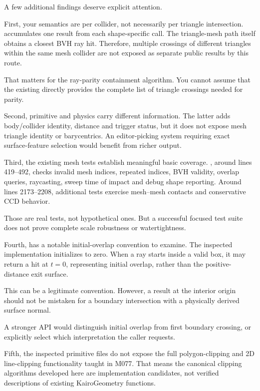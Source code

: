 A few additional findings deserve explicit attention.

First, your  semantics are per collider, not necessarily per triangle intersection.  accumulates one result from each shape-specific  call. The triangle-mesh path itself obtains a closest BVH ray hit. Therefore, multiple crossings of different triangles within the same mesh collider are not exposed as separate public results by this route.

That matters for the ray-parity containment algorithm. You cannot assume that the existing  directly provides the complete list of triangle crossings needed for parity.

Second, primitive  and physics  carry different information. The latter adds body/collider identity, distance and trigger status, but it does not expose mesh triangle identity or barycentrics. An editor-picking system requiring exact surface-feature selection would benefit from richer output.

Third, the existing mesh tests establish meaningful basic coverage. , around lines 419--492, checks invalid mesh indices, repeated indices, BVH validity, overlap queries, raycasting, sweep time of impact and debug shape reporting. Around lines 2173--2208, additional tests exercise mesh--mesh contacts and conservative CCD behavior.

Those are real tests, not hypothetical ones. But a successful focused test suite does not prove complete scale robustness or watertightness.

Fourth,  has a notable initial-overlap convention to examine. The inspected implementation initializes  to zero. When a ray starts inside a valid box, it may return a hit at \(t=0\), representing initial overlap, rather than the positive-distance exit surface.

This can be a legitimate convention. However, a result at the interior origin should not be mistaken for a boundary intersection with a physically derived surface normal.

A stronger API would distinguish initial overlap from first boundary crossing, or explicitly select which interpretation the caller requests.

Fifth, the inspected primitive files do not expose the full polygon-clipping and 2D line-clipping functionality taught in M077. That means the canonical clipping algorithms developed here are implementation candidates, not verified descriptions of existing KairoGeometry functions.

